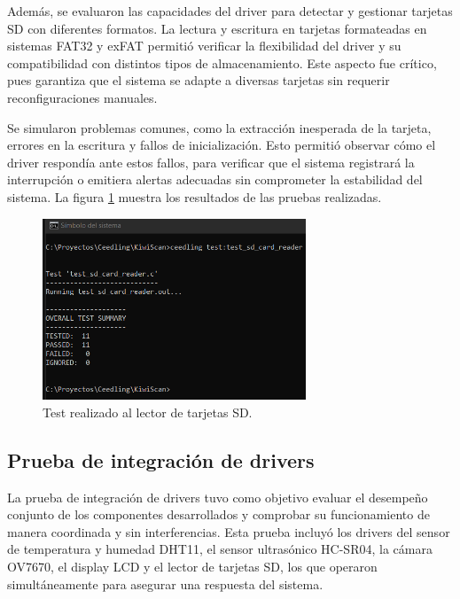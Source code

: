 Además, se evaluaron las capacidades del driver para detectar y gestionar tarjetas SD con diferentes formatos. La lectura y escritura en tarjetas formateadas en sistemas FAT32 y exFAT permitió verificar la flexibilidad del driver y su compatibilidad con distintos tipos de almacenamiento. Este aspecto fue crítico, pues garantiza que el sistema se adapte a diversas tarjetas sin requerir reconfiguraciones manuales.

Se simularon problemas comunes, como la extracción inesperada de la tarjeta, errores en la escritura y fallos de inicialización. Esto permitió observar cómo el driver respondía ante estos fallos, para verificar que el sistema registrará la interrupción o emitiera alertas adecuadas sin comprometer la estabilidad del sistema. La figura \ref{fig:test_sd_card_reader} muestra los resultados de las pruebas realizadas.

\vspace{1cm}

\begin{figure}[htbp]
	\centering
	\includegraphics[width=0.7\textwidth, height=0.3\textheight]{./Figures/test_sd_card_reader.png}
	\caption{Test realizado al lector de tarjetas SD.}
	\label{fig:test_sd_card_reader}
\end{figure}

\vspace{1cm}

\subsection{Prueba de integración de drivers}

La prueba de integración de drivers tuvo como objetivo evaluar el desempeño conjunto de los componentes desarrollados y comprobar su funcionamiento de manera coordinada y sin interferencias. Esta prueba incluyó los drivers del sensor de temperatura y humedad DHT11, el sensor ultrasónico HC-SR04, la cámara OV7670, el display LCD y el lector de tarjetas SD, los que operaron simultáneamente para asegurar una respuesta del sistema.

